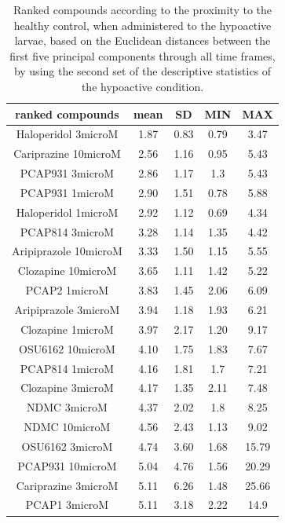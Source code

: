 \begin{table}[h!]\tiny
\centering
\caption{Ranked compounds according to the proximity to the healthy control, when administered to the hypoactive larvae, based on the Euclidean distances between the first five principal components through all time frames, by using the second set of the descriptive statistics of the hypoactive condition.}
\begin{tabular}{|c|c|c|c|c|}
\hline
ranked compounds             & mean & SD   & MIN  & MAX   \\ \hline
Haloperidol 3microM   & 1.87  & 0.83  & 0.79 & 3.47  \\ \hline
Cariprazine 10microM  & 2.56  & 1.16  & 0.95 & 5.43  \\ \hline
PCAP931 3microM       & 2.86  & 1.17  & 1.3  & 5.43  \\ \hline
PCAP931 1microM       & 2.90   & 1.51  & 0.78 & 5.88  \\ \hline
Haloperidol 1microM   & 2.92  & 1.12  & 0.69 & 4.34  \\ \hline
PCAP814 3microM       & 3.28  & 1.14  & 1.35 & 4.42  \\ \hline
Aripiprazole 10microM & 3.33  & 1.50   & 1.15 & 5.55  \\ \hline
Clozapine 10microM    & 3.65  & 1.11  & 1.42 & 5.22  \\ \hline
PCAP2 1microM         & 3.83  & 1.45  & 2.06 & 6.09  \\ \hline
Aripiprazole 3microM  & 3.94  & 1.18  & 1.93 & 6.21  \\ \hline
Clozapine 1microM     & 3.97  & 2.17  & 1.20  & 9.17  \\ \hline
OSU6162 10microM      & 4.10   & 1.75  & 1.83 & 7.67  \\ \hline
PCAP814 1microM       & 4.16  & 1.81  & 1.7  & 7.21  \\ \hline
Clozapine 3microM     & 4.17  & 1.35  & 2.11 & 7.48  \\ \hline
NDMC 3microM          & 4.37  & 2.02  & 1.8  & 8.25  \\ \hline
NDMC 10microM         & 4.56  & 2.43  & 1.13 & 9.02  \\ \hline
OSU6162 3microM       & 4.74  & 3.60   & 1.68 & 15.79 \\ \hline
PCAP931 10microM      & 5.04  & 4.76  & 1.56 & 20.29 \\ \hline
Cariprazine 3microM   & 5.11  & 6.26  & 1.48 & 25.66 \\ \hline
PCAP1 3microM         & 5.11  & 3.18  & 2.22 & 14.9  \\ \hline

\end{tabular}
\end{table}
